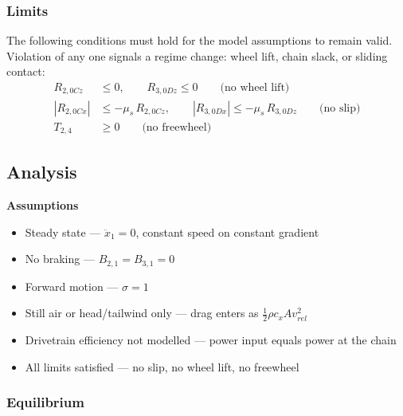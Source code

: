 \documentclass[10pt]{extarticle}
\numberwithin{equation}{subsubsection}
\begin{document}
\subsubsection{Limits}

The following conditions must hold for the model assumptions to remain valid. Violation of any one signals a regime change: wheel lift, chain slack, or sliding contact:
\begin{align}
    R_{2,0Cz} &\le 0, \qquad R_{3,0Dz} \le 0 \qquad \text{(no wheel lift)} \\
    \left|R_{2,0Cx}\right| &\le -\mu_s\,R_{2,0Cz}, \qquad
    \left|R_{3,0Dx}\right| \le -\mu_s\,R_{3,0Dz} \qquad \text{(no slip)} \\
    T_{2,4} &\ge 0 \qquad \text{(no freewheel)}
\end{align}

\newpage
\subsection{Analysis}

\textbf{Assumptions}
\begin{itemize}
    \item Steady state --- $\ddot{x}_1 = 0$, constant speed on constant gradient
    \item No braking --- $B_{2,1} = B_{3,1} = 0$
    \item Forward motion --- $\sigma = 1$
    \item Still air or head/tailwind only --- drag enters as $\tfrac{1}{2}\rho c_x A v_{rel}^2$
    \item Drivetrain efficiency not modelled --- power input equals power at the chain
    \item All limits satisfied --- no slip, no wheel lift, no freewheel
\end{itemize}

\subsubsection{Equilibrium}
\end{document}
